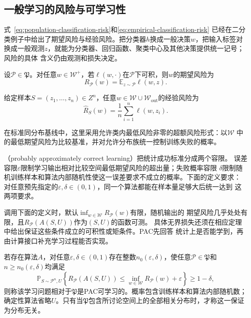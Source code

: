 \subsection{一般学习的风险与可学习性}

式~\eqref{eq:population-classification-risk}和\eqref{eq:empirical-classification-risk}
已经在二分类例子中给出了期望风险与经验风险。把分类器$h$换成一般决策$w$，把输入标签对
换成一般观测$z$，就能为分类器、回归函数、聚类中心及其他决策提供统一记号；风险的具体
含义仍由观测和损失决定。

\begin{definition}[一般学习问题的期望风险]
\label{def:general-population-risk}
设$\mathcal P\in\mathfrak P$。对任意$w\in\mathcal W^+$，若$\ell(w,\cdot)$在$\mathcal P$下可积，则$w$的期望风险为
\[
 R_{\mathcal P}(w)=\mathbb E_{z\sim\mathcal P}\ell(w,z).
\]
\end{definition}

\begin{definition}[一般学习问题的经验风险]
\label{def:general-empirical-risk}
给定样本$S=(z_1,\ldots,z_n)\in Z^n$，任意$w\in\mathcal W\cup\mathcal W_{\mathrm{out}}$的经验风险为
\begin{equation}
 \hat R_S(w)=\frac1n\sum_{i=1}^n\ell(w,z_i).
 \label{eq:general-risk}
\end{equation}
\end{definition}

在标准同分布基线中，这里采用允许类内最低风险非零的超额风险形式：以$\mathcal W$
中的最低期望风险为比较基准，并对允许分布族统一控制训练失败的概率。

（probably approximately correct learning）把统计成功标准分成两个容限。
误差容限$\varepsilon$限制学习输出相对比较空间最低期望风险的超出量；失败概率容限
$\delta$限制随机训练样本和算法内部随机性使这一误差要求不成立的概率。下面的定义要求：
对任意预先指定的$\varepsilon,\delta\in(0,1)$，同一个算法都能在样本量足够大后统一达到
这两项要求。

调用下面的定义时，默认$\inf_{w\in\mathcal W}R_{\mathcal P}(w)$有限，随机输出的
期望风险几乎处处有限，且$R_{\mathcal P}(A(S,U))$作为$(S,U)$的函数可测。
具体无界损失还须在相应定理中给出保证这些条件成立的可积性或矩条件。PAC先回答
统计上是否能学到，再由计算接口补充学习过程能否实现。

\begin{definition}[相对于分布族的PAC可学习性]
\label{def:general-pac-learnability}
若存在算法$A$，对任意$\varepsilon,\delta\in(0,1)$存在整数$n_0(\varepsilon,\delta)$，使任意$\mathcal P\in\mathfrak P$和$n\geq n_0(\varepsilon,\delta)$均满足
\[
 \mathbb P_{S\sim\mathcal P^n,U}\!\left\{
 R_{\mathcal P}(A(S,U))\leq
 \inf_{w\in\mathcal W}R_{\mathcal P}(w)+\varepsilon
 \right\}\geq1-\delta,
\]
则称该学习问题相对于$\mathfrak P$是PAC可学习的。概率包含训练样本和算法内部随机数；确定性算法省略$U$。只有当$\mathfrak P$包含所讨论空间上的全部相关分布时，才称这一保证为分布无关。
\end{definition}

